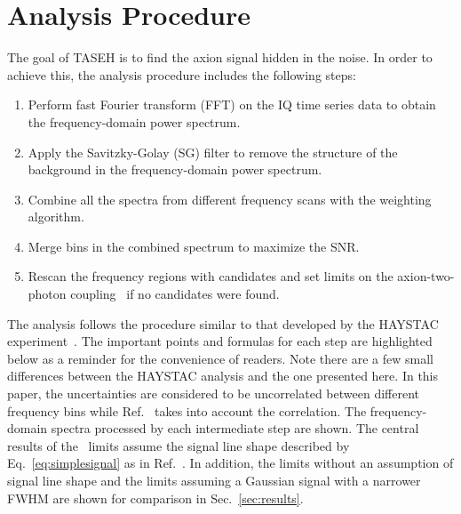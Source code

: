 \section{Analysis Procedure} \label{sec:ana}
The goal of TASEH is to find the axion signal hidden in the noise. In 
order to achieve this, the analysis procedure includes the following steps:
    \begin{enumerate}
        \item Perform fast Fourier transform (FFT) on the 
IQ time series data to obtain the frequency-domain power spectrum.
        \item Apply the Savitzky-Golay (SG) filter to remove the structure 
of the background in the frequency-domain power spectrum.
        \item Combine all the spectra from different frequency scans with 
the weighting algorithm.
        \item Merge bins in the combined spectrum to maximize the SNR. 
       \item Rescan the frequency regions with candidates and set limits on 
      the axion-two-photon coupling \gagg\ if no candidates were found.
    \end{enumerate}

    The analysis follows the procedure similar to that 
developed by the HAYSTAC experiment~\cite{HAYSTACII}. The important points  
and formulas for each step are highlighted below as a reminder 
for the convenience of readers. Note there are a few  
small differences between the HAYSTAC analysis and the one presented here. 
In this paper, the uncertainties are considered to be uncorrelated between 
different frequency bins while Ref.~\cite{HAYSTACII} takes into account 
the correlation. The frequency-domain spectra processed by each intermediate 
step are shown. The central results of the \gagg\ limits assume the signal 
line shape described by Eq.~\eqref{eq:simplesignal} as in 
Ref.~\cite{HAYSTACII}. In addition, the limits without an assumption of 
signal line shape and the limits assuming a 
Gaussian signal with a narrower FWHM are 
shown for comparison in Sec.~\ref{sec:results}.


